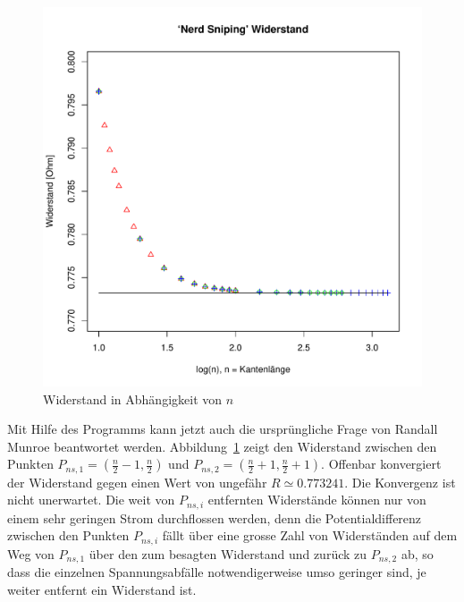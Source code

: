 \begin{figure}
\begin{center}
\includegraphics[width=\hsize]{graphics/snipingresistance}
\end{center}
\caption{Widerstand in Abhängigkeit von $n$\label{snipingresistance}}
\end{figure}
Mit Hilfe des Programms kann jetzt auch die ursprüngliche Frage von
Randall Munroe beantwortet werden. Abbildung~\ref{snipingresistance} zeigt
den Widerstand zwischen den Punkten $P_{ns,1}=(\frac{n}2-1,\frac{n}2)$ und
$P_{ns,2}=(\frac{n}2+1,\frac{n}2+1)$. Offenbar konvergiert der Widerstand
gegen einen Wert von ungefähr $R\simeq 0.773241$.  Die Konvergenz
ist nicht unerwartet.  Die weit von $P_{ns,i}$ entfernten Widerstände
können nur von einem sehr geringen Strom durchflossen werden, denn die
Potentialdifferenz zwischen den Punkten $P_{ns,i}$ fällt über eine
grosse Zahl von Widerständen auf dem Weg von $P_{ns,1}$ über den zum
besagten Widerstand und zurück zu $P_{ns,2}$ ab, so dass die einzelnen
Spannungsabfälle notwendigerweise umso geringer sind, je weiter entfernt
ein Widerstand ist.


